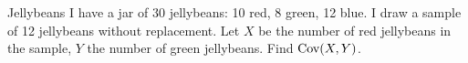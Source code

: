 \documentclass[11.5pt]{article}
\begin{document}





\begin{exercise}{Jellybeans}
I have a jar of 30 jellybeans: 10 red, 8 green, 12 blue. I draw a sample
of 12 jellybeans without replacement. Let $X$ be the number of red jellybeans in the sample, $Y$ the number of green jellybeans. Find $\textrm{Cov}(X, Y)$.
\end{exercise}
\end{document}

